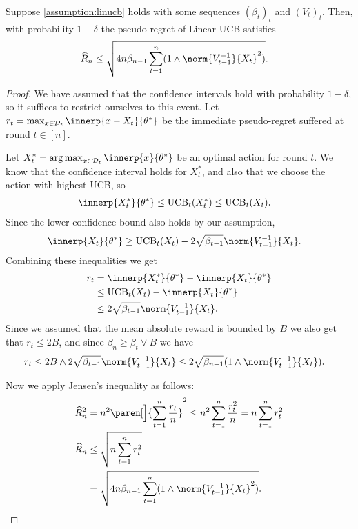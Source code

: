 \documentclass{article}
\newcommand{\inv}[1]{#1^{-1}}
\newcommand{\UCB}{\operatorname{UCB}}
\DeclareMathOperator*{\argmax}{arg\,max}
\DeclarePairedDelimiter{\paren}()
\newcommand{\Dset}[1]{\mathcal{D}_{#1}}
\begin{document}
\begin{lemma}\label{lemma:linucb-regret}
  Suppose \cref{assumption:linucb} holds with some sequences
  ${(\beta_t)}_t$ and ${(V_t)}_t$.  Then, with probability $1-\delta$
  the pseudo-regret of Linear UCB satisfies
  \begin{align*}
    \widehat{R}_n &\le \sqrt{4n\beta_{n-1} \sum_{t=1}^n (1 \wedge \norm{\inv{V_{t-1}}}{X_t}^2)}.
  \end{align*}

  \begin{proof}
    We have assumed that the confidence intervals hold with
    probability $1-\delta$, so it suffices to restrict ourselves to
    this event.  Let
    $r_t = \max_{x\in\Dset{t}} \innerp{x-X_t}{\theta^*}$ be the
    immediate pseudo-regret suffered at round $t\in[n]$.

    Let $X_t^* = \argmax_{x\in\Dset{t}}\innerp{x}{\theta^*}$ be an optimal
    action for round $t$.  We know that the confidence interval holds
    for $X_t^*$, and also that we choose the action with highest UCB, so
    \begin{align*}
      \innerp{X_t^*}{\theta^*} &\le \UCB_t(X_t^*) \le \UCB_t(X_t).
    \end{align*}
    Since the lower confidence bound also holds by our assumption,
    \begin{align*}
      \innerp{X_t}{\theta^*} &\ge \UCB_t(X_t) - 2\sqrt{\beta_{t-1}}\norm{\inv{V_{t-1}}}{X_t}.
    \end{align*}
    Combining these inequalities we get
    \begin{align*}
      r_t &= \innerp{X_t^*}{\theta^*} - \innerp{X_t}{\theta^*} \\
         &\le \UCB_t(X_t) - \innerp{X_t}{\theta^*} \\
         &\le 2\sqrt{\beta_{t-1}}\norm{\inv{V_{t-1}}}{X_t}.
    \end{align*}
    Since we assumed that the mean absolute reward is bounded by $B$
    we also get that $r_t \le 2B$, and since $\beta_n \ge \beta_t \vee B$
    we have
    \begin{align*}
      r_t &\le 2B \wedge 2\sqrt{\beta_{t-1}}\norm{\inv{V_{t-1}}}{X_t}
           \le 2\sqrt{\beta_{n-1}} (1 \wedge \norm{\inv{V_{t-1}}}{X_t}).
    \end{align*}

    Now we apply Jensen's inequality as follows:
    \begin{align*}
      \widehat{R}_n^2 &= n^2 \paren[\Big]{\sum_{t=1}^n \frac{r_t}{n}}^2
                      \le n^2 \sum_{t=1}^n \frac{r_t^2}{n} = n\sum_{t=1}^nr_t^2 \\
      \widehat{R}_n &\le \sqrt{n\sum_{t=1}^n r_t^2} \\
                    &= \sqrt{4n\beta_{n-1} \sum_{t=1}^n (1 \wedge \norm{\inv{V_{t-1}}}{X_t}^2)}.
                      \qedhere
    \end{align*}
  \end{proof}
\end{lemma}
\end{document}
